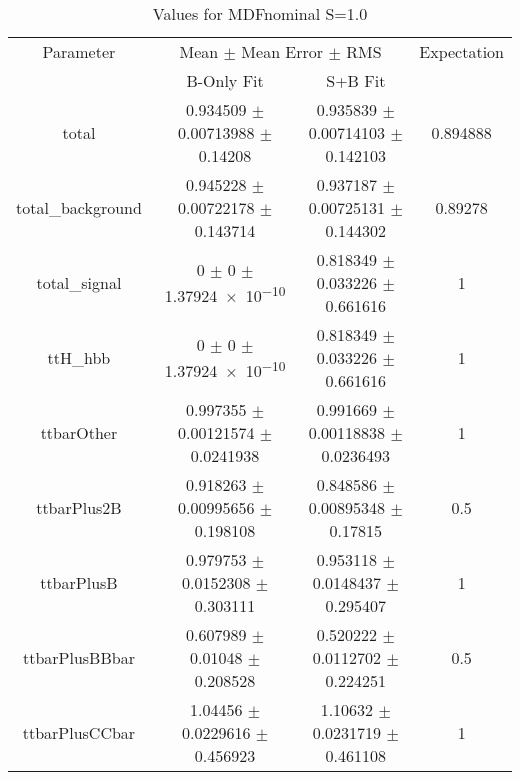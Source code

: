 \begin{table}
\centering
\caption{Values for MDFnominal S=1.0}
\begin{tabular}{cccc}
\toprule
Parameter & \multicolumn{2}{c}{Mean $\pm$ Mean Error $\pm$ RMS} & Expectation\\
 & B-Only Fit & S+B Fit & \\
\midrule
total & \num{0.934509} $\pm$ \num{0.00713988} $\pm$ \num{0.14208} & \num{0.935839} $\pm$ \num{0.00714103} $\pm$ \num{0.142103} & \num{0.894888}\\
total\_background & \num{0.945228} $\pm$ \num{0.00722178} $\pm$ \num{0.143714} & \num{0.937187} $\pm$ \num{0.00725131} $\pm$ \num{0.144302} & \num{0.89278}\\
total\_signal & \num{0} $\pm$ \num{0} $\pm$ \num{1.37924e-10} & \num{0.818349} $\pm$ \num{0.033226} $\pm$ \num{0.661616} & \num{1}\\
ttH\_hbb & \num{0} $\pm$ \num{0} $\pm$ \num{1.37924e-10} & \num{0.818349} $\pm$ \num{0.033226} $\pm$ \num{0.661616} & \num{1}\\
ttbarOther & \num{0.997355} $\pm$ \num{0.00121574} $\pm$ \num{0.0241938} & \num{0.991669} $\pm$ \num{0.00118838} $\pm$ \num{0.0236493} & \num{1}\\
ttbarPlus2B & \num{0.918263} $\pm$ \num{0.00995656} $\pm$ \num{0.198108} & \num{0.848586} $\pm$ \num{0.00895348} $\pm$ \num{0.17815} & \num{0.5}\\
ttbarPlusB & \num{0.979753} $\pm$ \num{0.0152308} $\pm$ \num{0.303111} & \num{0.953118} $\pm$ \num{0.0148437} $\pm$ \num{0.295407} & \num{1}\\
ttbarPlusBBbar & \num{0.607989} $\pm$ \num{0.01048} $\pm$ \num{0.208528} & \num{0.520222} $\pm$ \num{0.0112702} $\pm$ \num{0.224251} & \num{0.5}\\
ttbarPlusCCbar & \num{1.04456} $\pm$ \num{0.0229616} $\pm$ \num{0.456923} & \num{1.10632} $\pm$ \num{0.0231719} $\pm$ \num{0.461108} & \num{1}\\
\bottomrule
\end{tabular}
\end{table}